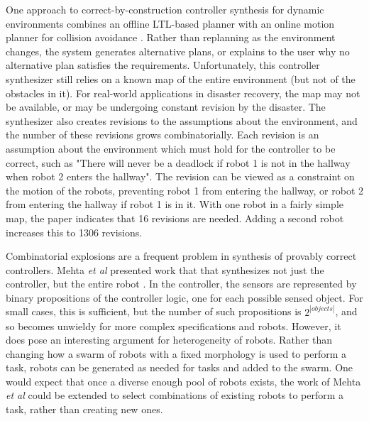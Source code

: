 One approach to correct-by-construction controller synthesis for dynamic environments combines an offline LTL-based planner with an online motion planner for collision avoidance \citep{alonso2018reactive}. 
Rather than replanning as the environment changes, the system generates alternative plans, or explains to the user why no alternative plan satisfies the requirements.  
Unfortunately, this controller synthesizer still relies on a known map of the entire environment (but not of the obstacles in it). 
For real-world applications in disaster recovery, the map may not be available, or may be undergoing constant revision by the disaster. 
The synthesizer also creates revisions to the assumptions about the environment, and the number of these revisions grows combinatorially. 
Each revision is an assumption about the environment which must hold for the controller to be correct, such as "There will never be a deadlock if robot 1 is not in the hallway when robot 2 enters the hallway".
The revision can be viewed as a constraint on the motion of the robots, preventing robot 1 from entering the hallway, or robot 2 from entering the hallway if robot 1 is in it. 
With one robot in a fairly simple map, the paper indicates that 16 revisions are needed. 
Adding a second robot increases this to 1306 revisions.  

Combinatorial explosions are a frequent problem in synthesis of provably correct controllers. 
Mehta \emph{et al} presented work that that synthesizes not just the controller, but the entire robot \citep{mehta2018robot}.
In the controller, the sensors are represented by binary propositions of the controller logic, one for each possible sensed object.
For small cases, this is sufficient, but the number of such propositions is $2^{|objects|}$, and so becomes unwieldy for more complex specifications and robots.  
However, it does pose an interesting argument for heterogeneity of robots. 
Rather than changing how a swarm of robots with a fixed morphology is used to perform a task, robots can be generated as needed for tasks and added to the swarm. 
One would expect that once a diverse enough pool of robots exists, the work of Mehta \emph{et al} could be extended to select combinations of existing robots to perform a task, rather than creating new ones. 

